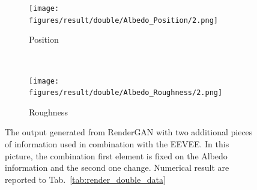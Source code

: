 \begin{figure}[h!]
    \begin{subfigure}[b]{0.175\textwidth}
     \texttt{[image: figures/result/double/Albedo\_Position/2.png]}
     \caption{Position}
    \end{subfigure}
    ~
    \begin{subfigure}[b]{0.175\textwidth}
     \texttt{[image: figures/result/double/Albedo\_Roughness/2.png]}
     \caption{Roughness}
    \end{subfigure}
    \caption[Generation Result with fixed input on Albedo]{The output generated from RenderGAN with two additional pieces of information used in combination with the EEVEE. In this picture, the combination first element is fixed on the Albedo information and the second one change. Numerical result are reported to Tab.~\ref{tab:render_double_data}}
    \label{fig:double_input_base_albedo_generation}
\end{figure}

